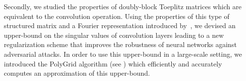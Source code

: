 
%

Secondly, we studied the properties of doubly-block Toeplitz matrices which are equivalent to the convolution operation. 
Using the properties of this type of structured matrix and a Fourier representation introduced by~\citet{grenander1958toeplitz}, we devised an upper-bound on the singular values of convolution layers leading to a new regularization scheme that improves the robustness of neural networks against adversarial attacks.
In order to use this upper-bound in a large-scale setting, we introduced the PolyGrid algorithm (see ) which efficiently and accurately computes an approximation of this upper-bound.






%
%




